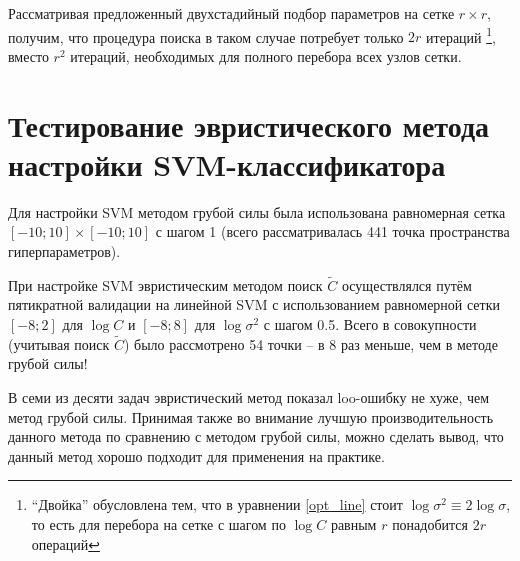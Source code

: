 \documentclass[14pt,a4paper,article]{ncc}
\numberwithin{equation}{subsection}
\begin{document}
Рассматривая предложенный двухстадийный подбор параметров на сетке $r \times r$, получим, что процедура поиска в таком случае потребует только $2r$ итераций \footnote{``Двойка'' обусловлена тем, что в уравнении \ref{opt_line} стоит $\log \sigma^2 \equiv 2 \log \sigma$, то есть для перебора на сетке с шагом по $\log C$ равным $r$ понадобится $2r$ операций}, вместо $r^2$ итераций, необходимых для полного перебора всех узлов сетки.

\section{Тестирование эвристического метода настройки SVM-классификатора}

\begin{center}
	\begin{table}[H]
		\caption{Сравнение поведения SVM при двух методах настройки}
	\end{table}
\end{center}

Для настройки SVM методом грубой силы была использована равномерная сетка $[-10; 10] \times [-10; 10]$ с шагом 1 (всего рассматривалась 441 точка пространства гиперпараметров).

При настройке SVM эвристическим методом поиск $\tilde{C}$ осуществлялся путём пятикратной валидации на линейной SVM с использованием равномерной сетки $[-8; 2]$ для $\log C$ и $[-8; 8]$ для $\log \sigma ^ 2$ с шагом 0.5. Всего в совокупности (учитывая поиск $\tilde{C}$) было рассмотрено 54 точки -- в 8 раз меньше, чем в методе грубой силы!

В семи из десяти задач эвристический метод показал loo-ошибку не хуже, чем метод грубой силы. Принимая также во внимание лучшую производительность данного метода по сравнению с методом грубой силы, можно сделать вывод, что данный метод хорошо подходит для применения на практике.

\printbibliography
\end{document}
